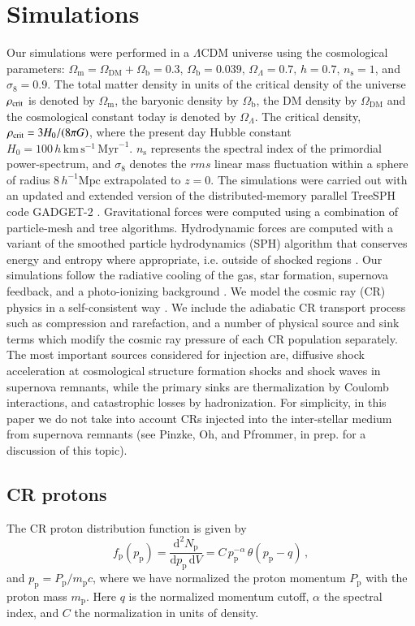 \documentclass[useAMS,usenatbib]{mn2e}
\newcommand{\dd}{\mathrm{d}}
\newcommand{\p}{\mathrm{p}}
\newcommand{\mr}{\mathrm}
\newcommand{\DM}{\mathrm{DM}}
\begin{document}
\section{Simulations}
\label{sect:simulations}
Our simulations were performed in a $\Lambda$CDM universe using the
cosmological parameters: $\Omega_{\mr m}=\Omega_\DM + \Omega_{\mr
  b}=0.3, \, \Omega_{\mr b}=0.039, \, \Omega_\Lambda=0.7, \, h=0.7, \,
n_{\mr s}=1$, and $\sigma_8=0.9$. The total matter density in units of
the critical density of the universe $\rho_{\rm crit}$ is denoted by
$\Omega_{\mr m}$, the baryonic density by $\Omega_{\mr b}$, the DM
density by $\Omega_\DM$ and the cosmological constant today is denoted
by $\Omega_\Lambda$. The critical density, $\rho_{\rm crit}=3H_0/(8\pi
G)$, where the present day Hubble constant $H_0=100\, h \, \mr{km}\,
\mr{s}^{-1} \, \mr{Myr}^{-1}$. $n_{\mr s}$ represents the spectral
index of the primordial power-spectrum, and $\sigma_8$ denotes the
$rms$ linear mass fluctuation within a sphere of radius $8 \,h^{-1}
\mr{Mpc}$ extrapolated to $z = 0$. The simulations were carried out
with an updated and extended version of the distributed-memory
parallel TreeSPH code GADGET-2 \citep{2005MNRAS.364.1105S,
  2001NewA....6...79S}. Gravitational forces were computed using a
combination of particle-mesh and tree algorithms.  Hydrodynamic forces
are computed with a variant of the smoothed particle hydrodynamics
(SPH) algorithm that conserves energy and entropy where appropriate,
i.e. outside of shocked regions \citep{2002MNRAS.333..649S}.  Our
simulations follow the radiative cooling of the gas, star formation,
supernova feedback, and a photo-ionizing background \citep[details can
  be found in][]{2007MNRAS.378..385P}. We model the cosmic ray (CR)
physics in a self-consistent way \citep{2006MNRAS.367..113P,
  2007A&A...473...41E, 2008A&A...481...33J}.  We include the adiabatic
CR transport process such as compression and rarefaction, and a number
of physical source and sink terms which modify the cosmic ray pressure
of each CR population separately. The most important sources
considered for injection are, diffusive shock acceleration at
cosmological structure formation shocks and shock waves in supernova
remnants, while the primary sinks are thermalization by Coulomb
interactions, and catastrophic losses by hadronization. For
simplicity, in this paper we do not take into account CRs injected
into the inter-stellar medium from supernova remnants (see Pinzke, Oh,
and Pfrommer, in prep. for a discussion of this topic).

\subsection{CR protons}
The CR proton distribution function is given by
\begin{equation}
  \label{eq:f_p}
  f_\p(p_\p) = \frac{\dd^2 N_\p}{\dd p_\p\,\dd V} = 
  C\, p_\p^{-\alpha}\,\theta(p_\p-q)\,, 
\end{equation}
and $p_\p = P_\p/m_\p c$, where we have normalized the proton momentum
$P_\p$ with the proton mass $m_\p$.  Here $q$ is the normalized
momentum cutoff, $\alpha$ the spectral index, and $C$ the
normalization in units of density. 
\end{document}
